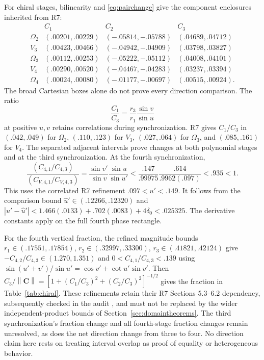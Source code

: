 \documentclass[11pt,a4paper]{article}
\numberwithin{equation}{section}
\newcommand{\norm}[1]{\left\lVert#1\right\rVert}
\newcommand{\chiral}{\mathbf C}
\begin{document}
For chiral stages, bilinearity and \eqref{eq:pairchange} give the component
enclosures inherited from R7:
\[
\begin{array}{c|ccc}
&C_1&C_2&C_3\\ \hline
\Omega_2&(.00201,.00229)&(-.05814,-.05788)&(.04689,.04712)\\
V_3&(.00423,.00466)&(-.04942,-.04909)&(.03798,.03827)\\
\Omega_3&(.00112,.00253)&(-.05222,-.05112)&(.04008,.04101)\\
V_4&(.00290,.00520)&(-.04467,-.04283)&(.03237,.03394)\\
\Omega_4&(.00024,.00080)&(-.01177,-.00697)&(.00515,.00924).
\end{array}
\]
The broad Cartesian boxes alone do not prove every direction comparison.
The ratio
\[
\frac{C_1}{C_3}=\frac{r_3}{r_1}\frac{\sin v}{\sin u}
\]
at positive $u,v$ retains correlations during synchronization. R7 gives
$C_1/C_3$ in $(.042,.049)$ for $\Omega_2$, $(.110,.123)$ for $V_3$,
$(.027,.064)$ for $\Omega_3$, and $(.085,.161)$ for $V_4$.
The separated adjacent intervals prove changes at both polynomial stages
and at the third synchronization. At the fourth synchronization,
\[
\frac{(C_{4,1}/C_{4,3})}{(C_{V,4,1}/C_{V,4,3})}
=\frac{\sin v'}{\sin v}\frac{\sin u}{\sin u'}
<\frac{.147}{.99975}\frac{.614}{.9962(.097)}<.935<1.
\]
This uses the correlated R7 refinement $.097<u'<.149$.
It follows from the comparison bound
$\widehat u'\in(.12266,.12320)$ and
$|u'-\widehat u'|<1.466(.0133)+.702(.0083)+4\delta_0<.025325$.
The derivative constants apply on the full fourth phase rectangle.

For the fourth vertical fraction, the refined magnitude bounds
$r_1\in(.17551,.17854)$, $r_2\in(.32997,.33300)$,
$r_3\in(.41821,.42124)$ give
$-C_{4,2}/C_{4,3}\in(1.270,1.351)$ and
$0<C_{4,1}/C_{4,3}<.139$ using
$\sin(u'+v')/\sin u'=\cos v'+\cot u'\sin v'$.
Then
$C_3/\norm{\chiral}=[1+(C_1/C_3)^2+(C_2/C_3)^2]^{-1/2}$
gives the fraction in Table~\ref{tab:chiral}. These refinements retain their
R7 Sections 5.3--6.2 dependency, subsequently checked in the audit
\cite{Audit}, and must not be replaced by the wider independent-product
bounds of Section~\ref{sec:domaintheorems}.
The third synchronization's fraction change and all fourth-stage fraction
changes remain unresolved, as does the net direction change from three
to four. No direction claim here rests on treating interval overlap as
proof of equality or heterogeneous behavior.
\end{document}
